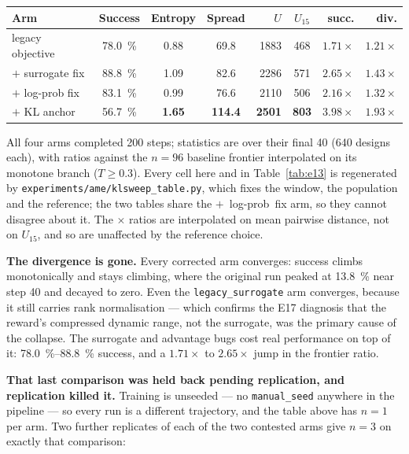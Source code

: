
\begin{center}
\begin{tabular}{@{}lcccrcrr@{}}
\toprule
\textbf{Arm} & \textbf{Success} & \textbf{Entropy} & \textbf{Spread} &
$U$ & $U_{15}$ & \textbf{succ.} & \textbf{div.} \\
\midrule
legacy objective   & \SI{78.0}{\percent} & 0.88 & 69.8  & 1883 & 468 & $1.71\times$ & $1.21\times$ \\
$+$ surrogate fix  & \SI{88.8}{\percent} & 1.09 & 82.6  & 2286 & 571 & $2.65\times$ & $1.43\times$ \\
$+$ log-prob fix   & \SI{83.1}{\percent} & 0.99 & 76.6  & 2110 & 506 & $2.16\times$ & $1.32\times$ \\
$+$ KL anchor      & \SI{56.7}{\percent} & \textbf{1.65} & \textbf{114.4} &
  \textbf{2501} & \textbf{803} & $\mathbf{3.98\times}$ & $\mathbf{1.93\times}$ \\
\bottomrule
\end{tabular}
\end{center}

All four arms completed 200 steps; statistics are over their final 40 (640
designs each), with ratios against the $n = 96$ baseline frontier interpolated
on its monotone branch ($T \ge 0.3$). Every cell here and in
Table~\ref{tab:e13} is regenerated by \texttt{experiments/ame/klsweep\_table.py},
which fixes the window, the population and the reference; the two tables share
the $+$~log-prob~fix arm, so they cannot disagree about it. The $\times$ ratios
are interpolated on mean pairwise distance, not on $U_{15}$, and so are
unaffected by the reference choice.

\textbf{The divergence is gone.} Every corrected arm converges: success climbs
monotonically and stays climbing, where the original run peaked at
\SI{13.8}{\percent} near step 40 and decayed to zero. Even the
\texttt{legacy\_surrogate} arm converges, because it still carries rank
normalisation --- which confirms the E17 diagnosis that the reward's compressed
dynamic range, not the surrogate, was the primary cause of the collapse. The
surrogate and advantage bugs cost real performance on top of it:
\SIrange{78.0}{88.8}{\percent} success, and a $1.71\times$ to $2.65\times$ jump
in the frontier ratio.

\textbf{That last comparison was held back pending replication, and replication
killed it.} Training is unseeded --- no \texttt{manual\_seed} anywhere in the
pipeline --- so every run is a different trajectory, and the table above has
$n = 1$ per arm. Two further replicates of each of the two contested arms give
$n = 3$ on exactly that comparison:


